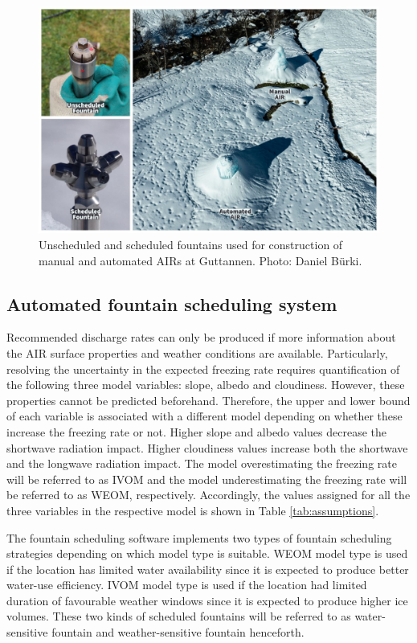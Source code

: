 \begin{figure}[htb]
	\includegraphics[width=\textwidth]{figs/AIR_fountains.jpg}
	\caption{Unscheduled and scheduled fountains used for construction of manual and automated AIRs at
		Guttannen. Photo: Daniel Bürki.}
	\label{fig:autovsman}
\end{figure}

\subsection{Automated fountain scheduling system}

Recommended discharge rates can only be produced if more information about the AIR surface properties and
weather conditions are available. Particularly, resolving the uncertainty in the expected freezing rate requires
quantification of the following three model variables: slope, albedo and cloudiness. However, these properties
cannot be predicted beforehand. Therefore, the upper and lower bound of each variable is associated with a
different model depending on whether these increase the freezing rate or not.  Higher slope and albedo values
decrease the shortwave radiation impact. Higher cloudiness values increase both the shortwave and the longwave
radiation impact. The model overestimating the freezing rate will be referred to as \ac{IVOM} and the model
underestimating the freezing rate will be referred to as  \ac{WEOM}, respectively. Accordingly, the values
assigned for all the three variables in the respective model is shown in Table \ref{tab:assumptions}.

The fountain scheduling software implements two types of fountain scheduling strategies depending on which model
type is suitable. WEOM model type is used if the location has limited water availability since it is expected to
produce better water-use efficiency. \ac{IVOM} model type is used if the location had limited duration of
favourable weather windows since it is expected to produce higher ice volumes. These two kinds of scheduled
fountains will be referred to as water-sensitive fountain and weather-sensitive fountain henceforth.

